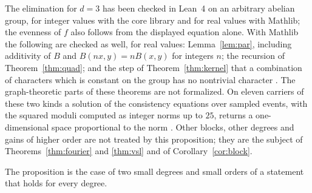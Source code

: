 The elimination for $d=3$ has been checked in Lean~4 on an arbitrary abelian group, for integer values with the core library and for real values with Mathlib; the evenness of $f$ also follows from the displayed equation alone. With Mathlib the following are checked as well, for real values: Lemma~\ref{lem:par}, including additivity of $B$ and $B(nx,y)=nB(x,y)$ for integers $n$; the recursion of Theorem~\ref{thm:quad}; and the step of Theorem~\ref{thm:kernel} that a combination of characters which is constant on the group has no nontrivial character \cite{comp4s}. The graph-theoretic parts of these theorems are not formalized. On eleven carriers of these two kinds a solution of the consistency equations over sampled events, with the squared moduli computed as integer norms up to $25$, returns a one-dimensional space proportional to the norm \cite{comp4s}. Other blocks, other degrees and gains of higher order are not treated by this proposition; they are the subject of Theorems~\ref{thm:fourier} and \ref{thm:vsl} and of Corollary~\ref{cor:block}.

The proposition is the case of two small degrees and small orders of a statement that holds for every degree.

